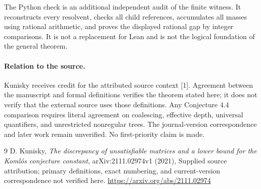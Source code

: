 \documentclass[11pt]{article}
\begin{document}
The Python check is an additional independent audit of the finite witness. It reconstructs every resolvent, checks all child references, accumulates all masses using rational arithmetic, and proves the displayed rational gap by integer comparisons. It is not a replacement for Lean and is not the logical foundation of the general theorem.

\paragraph{Relation to the source.}
Kunisky receives credit for the attributed source context [1]. Agreement
between the manuscript and formal definitions verifies the theorem stated
here; it does not verify that the external source uses those definitions.
Any Conjecture 4.4 comparison requires literal agreement on coalescing,
effective depth, universal quantifiers, and unrestricted nonregular trees.
The journal-version correspondence and later work remain unverified.
No first-priority claim is made.

\begin{thebibliography}{9}
 D. Kunisky, \emph{The discrepancy of unsatisfiable matrices and a lower bound for the Koml\'os conjecture constant}, arXiv:2111.02974v1 (2021), Supplied source attribution; primary definitions, exact numbering, and current-version correspondence not verified here.\newline
\url{https://arxiv.org/abs/2111.02974}
\end{thebibliography}
\end{document}
